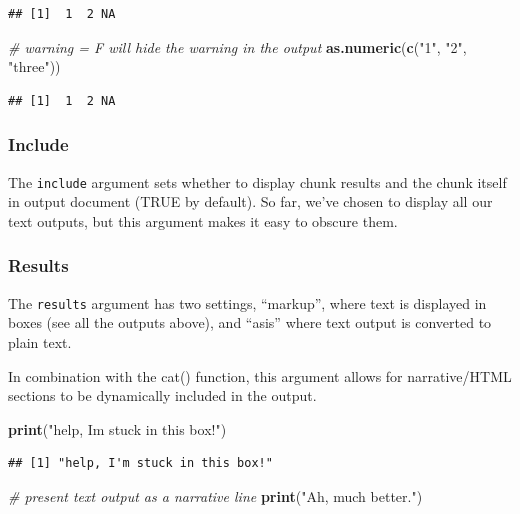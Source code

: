 \documentclass[
]{article}
\newenvironment{Shaded}{\begin{snugshade}}{\end{snugshade}}
\newcommand{\CommentTok}[1]{\textcolor[rgb]{0.56,0.35,0.01}{\textit{#1}}}
\newcommand{\FunctionTok}[1]{\textcolor[rgb]{0.13,0.29,0.53}{\textbf{#1}}}
\newcommand{\NormalTok}[1]{#1}
\newcommand{\StringTok}[1]{\textcolor[rgb]{0.31,0.60,0.02}{#1}}
\begin{document}
\begin{verbatim}
## [1]  1  2 NA
\end{verbatim}

\begin{Shaded}
\begin{Highlighting}[]
\CommentTok{\# warning = F will hide the warning in the output}
\FunctionTok{as.numeric}\NormalTok{(}\FunctionTok{c}\NormalTok{(}\StringTok{"1"}\NormalTok{, }\StringTok{"2"}\NormalTok{, }\StringTok{"three"}\NormalTok{))}
\end{Highlighting}
\end{Shaded}

\begin{verbatim}
## [1]  1  2 NA
\end{verbatim}

\subsubsection{Include}\label{include}

The \texttt{include} argument sets whether to display chunk results and
the chunk itself in output document (TRUE by default). So far, we've
chosen to display all our text outputs, but this argument makes it easy
to obscure them.

\subsubsection{Results}\label{results}

The \texttt{results} argument has two settings, ``markup'', where text
is displayed in boxes (see all the outputs above), and ``asis'' where
text output is converted to plain text.

In combination with the cat() function, this argument allows for
narrative/HTML sections to be dynamically included in the output.

\begin{Shaded}
\begin{Highlighting}[]
\FunctionTok{print}\NormalTok{(}\StringTok{"help, I\textquotesingle{}m stuck in this box!"}\NormalTok{)}
\end{Highlighting}
\end{Shaded}

\begin{verbatim}
## [1] "help, I'm stuck in this box!"
\end{verbatim}

\begin{Shaded}
\begin{Highlighting}[]
\CommentTok{\# present text output as a narrative line}
\FunctionTok{print}\NormalTok{(}\StringTok{"Ah, much better."}\NormalTok{)}
\end{Highlighting}
\end{Shaded}
\end{document}

